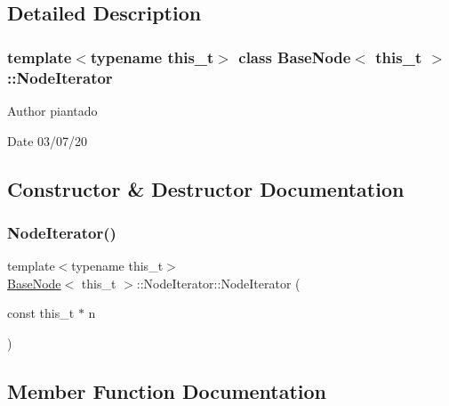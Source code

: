 \subsection{Detailed Description}
\subsubsection*{template$<$typename this\+\_\+t$>$\newline
class Base\+Node$<$ this\+\_\+t $>$\+::\+Node\+Iterator}

\begin{DoxyAuthor}{Author}
piantado 
\end{DoxyAuthor}
\begin{DoxyDate}{Date}
03/07/20 
\end{DoxyDate}


\subsection{Constructor \& Destructor Documentation}
\mbox{\label{class_base_node_1_1_node_iterator_a9414dbb668b4b98f5377d434f8577dc6}} 
\subsubsection{\texorpdfstring{Node\+Iterator()}{NodeIterator()}}
{\footnotesize\ttfamily template$<$typename this\+\_\+t$>$ \\
\hyperlink{class_base_node}{Base\+Node}$<$ this\+\_\+t $>$\+::Node\+Iterator\+::\+Node\+Iterator (\begin{DoxyParamCaption}\item[{const this\+\_\+t $\ast$}]{n }\end{DoxyParamCaption})\hspace{0.3cm}{\ttfamily [inline]}}



\subsection{Member Function Documentation}
\mbox{\label{class_base_node_1_1_node_iterator_a10e2c9cd9a879e6a5779981badfa335b}} 
